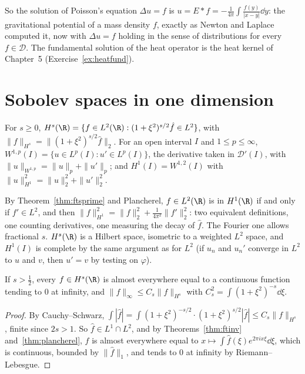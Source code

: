 So the solution of Poisson's equation $\Delta u=f$ is $u=E*f=-\frac1{4\pi}\int\frac{f(y)}{|x-y|}\dd y$: the gravitational potential of a mass density $f$, exactly as Newton and Laplace computed it, now with $\Delta u=f$ holding in
the sense of distributions for every $f\in\mathcal D$. The fundamental solution of the heat operator is the heat kernel of Chapter~5 (Exercise~\ref{ex:heatfund}).

\section{Sobolev spaces in one dimension}

\begin{definition}
For $s\ge0$, $H^s(\R)=\{f\in L^2(\R):(1+\xi^2)^{s/2}\hat f\in L^2\}$, with $\|f\|_{H^s}=\|(1+\xi^2)^{s/2}\hat f\|_2$. For an open interval $I$ and $1\le p\le\infty$,
$W^{1,p}(I)=\{u\in L^p(I):u'\in L^p(I)\}$, the derivative taken in $\mathcal D'(I)$, with $\|u\|_{W^{1,p}}=\|u\|_p+\|u'\|_p$; and $H^1(I)=W^{1,2}(I)$ with $\|u\|_{H^1}^2=\|u\|_2^2+\|u'\|_2^2$.
\end{definition}

By Theorem~\ref{thm:ftsprime} and Plancherel, $f\in L^2(\R)$ is in $H^1(\R)$ if and only if $f'\in L^2$, and then $\|f\|_{H^1}^2=\|f\|_2^2+\frac1{4\pi^2}\|f'\|_2^2$: two equivalent definitions, one counting derivatives, one
measuring the decay of $\hat f$. The Fourier one allows fractional $s$. $H^s(\R)$ is a Hilbert space, isometric to a weighted $L^2$ space, and $H^1(I)$ is complete by the same argument as for $L^2$ (if $u_n$ and $u_n'$
converge in $L^2$ to $u$ and $v$, then $u'=v$ by testing on $\varphi$).

\begin{theorem}\label{thm:sobolevR}
If $s>\frac12$, every $f\in H^s(\R)$ is almost everywhere equal to a continuous function tending to $0$ at infinity, and $\|f\|_\infty\le C_s\|f\|_{H^s}$ with $C_s^2=\int(1+\xi^2)^{-s}\dd\xi$.
\end{theorem}
\begin{proof}
By Cauchy--Schwarz, $\int|\hat f|=\int(1+\xi^2)^{-s/2}\cdot(1+\xi^2)^{s/2}|\hat f|\le C_s\|f\|_{H^s}$, finite since $2s>1$. So $\hat f\in L^1\cap L^2$, and by Theorems~\ref{thm:ftinv} and~\ref{thm:plancherel}, $f$ is almost everywhere equal to
$x\mapsto\int\hat f(\xi)e^{2\pi ix\xi}\dd\xi$, which is continuous, bounded by $\|\hat f\|_1$, and tends to $0$ at infinity by Riemann--Lebesgue.
\end{proof}

